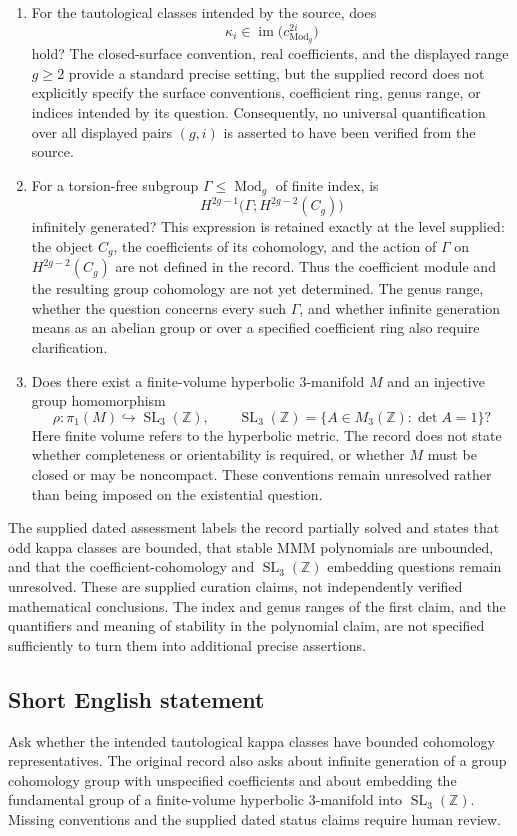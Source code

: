 \documentclass[11pt]{article}
\newcommand{\Z}{\mathbb{Z}}
\begin{document}
\begin{enumerate}
\item For the tautological classes intended by the source, does
\[
\kappa_i\in\operatorname{im}\bigl(c_{\operatorname{Mod}_g}^{2i}\bigr)
\]
hold? The closed-surface convention, real coefficients, and the displayed range \(g\geq 2\) provide a standard precise setting, but the supplied record does not explicitly specify the surface conventions, coefficient ring, genus range, or indices intended by its question. Consequently, no universal quantification over all displayed pairs \((g,i)\) is asserted to have been verified from the source.

\item For a torsion-free subgroup \(\Gamma\leq\operatorname{Mod}_g\) of finite index, is
\[
H^{2g-1}\bigl(\Gamma;H^{2g-2}(C_g)\bigr)
\]
infinitely generated? This expression is retained exactly at the level supplied: the object \(C_g\), the coefficients of its cohomology, and the action of \(\Gamma\) on \(H^{2g-2}(C_g)\) are not defined in the record. Thus the coefficient module and the resulting group cohomology are not yet determined. The genus range, whether the question concerns every such \(\Gamma\), and whether infinite generation means as an abelian group or over a specified coefficient ring also require clarification.

\item Does there exist a finite-volume hyperbolic \(3\)-manifold \(M\) and an injective group homomorphism
\[
\rho:\pi_1(M)\hookrightarrow\operatorname{SL}_3(\Z),
\qquad
\operatorname{SL}_3(\Z)=\{A\in M_3(\Z):\det A=1\}?
\]
Here finite volume refers to the hyperbolic metric. The record does not state whether completeness or orientability is required, or whether \(M\) must be closed or may be noncompact. These conventions remain unresolved rather than being imposed on the existential question.
\end{enumerate}

The supplied dated assessment labels the record partially solved and states that odd kappa classes are bounded, that stable MMM polynomials are unbounded, and that the coefficient-cohomology and \(\operatorname{SL}_3(\Z)\) embedding questions remain unresolved. These are supplied curation claims, not independently verified mathematical conclusions. The index and genus ranges of the first claim, and the quantifiers and meaning of stability in the polynomial claim, are not specified sufficiently to turn them into additional precise assertions.
\subsection{Short English statement}
Ask whether the intended tautological kappa classes have bounded cohomology representatives. The original record also asks about infinite generation of a group cohomology group with unspecified coefficients and about embedding the fundamental group of a finite-volume hyperbolic \(3\)-manifold into \(\operatorname{SL}_3(\Z)\). Missing conventions and the supplied dated status claims require human review.
\end{document}
